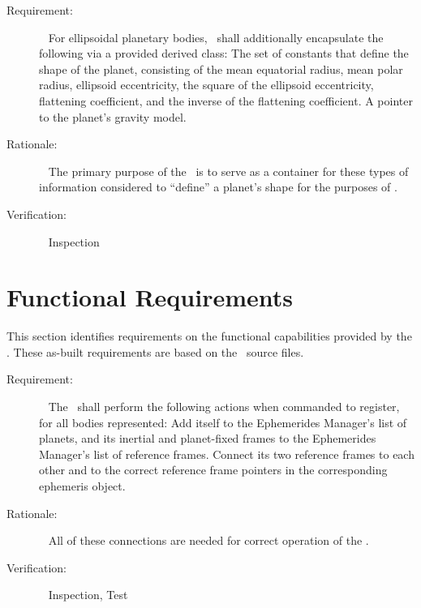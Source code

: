 \label{reqt:ellip_planet_data_encapsulation}
\begin{description}
  \item[Requirement:]\ \newline
    For ellipsoidal planetary bodies, \planetDesc\ shall additionally
    encapsulate the following via a provided derived class:
    The set of constants that define the shape of the planet, consisting of
    the mean equatorial radius, mean polar radius, ellipsoid eccentricity,
    the square of the ellipsoid eccentricity, flattening coefficient, and
    the inverse of the flattening coefficient.
    A pointer to the planet's gravity model.

  \item[Rationale:]\ \newline
    The primary purpose of the \planetDesc\ is to serve as
    a container for these types of information considered
    to ``define'' a planet's shape for the purposes of \JEODid.

  \item[Verification:]\ \newline
    Inspection
\end{description}


\section{Functional Requirements}\label{sec:func_reqts}
This section identifies requirements on the functional
capabilities provided by the \planetDesc.
These as-built requirements are based on the \planetDesc\ source files.

\label{reqt:func_base_register_model}
\begin{description}
  \item[Requirement:]\ \newline
    The \planetDesc\ shall perform the following actions
    when commanded to register, for all bodies represented:
    Add itself to the Ephemerides Manager's list of planets, and its
    inertial and planet-fixed frames to the Ephemerides Manager's
    list of reference frames.
    Connect its two reference frames to each other and to the correct
    reference frame pointers in the corresponding ephemeris object.

  \item[Rationale:]\ \newline
    All of these connections are needed for correct operation of the \planetDesc.

  \item[Verification:]\ \newline
    Inspection, Test
\end{description}

